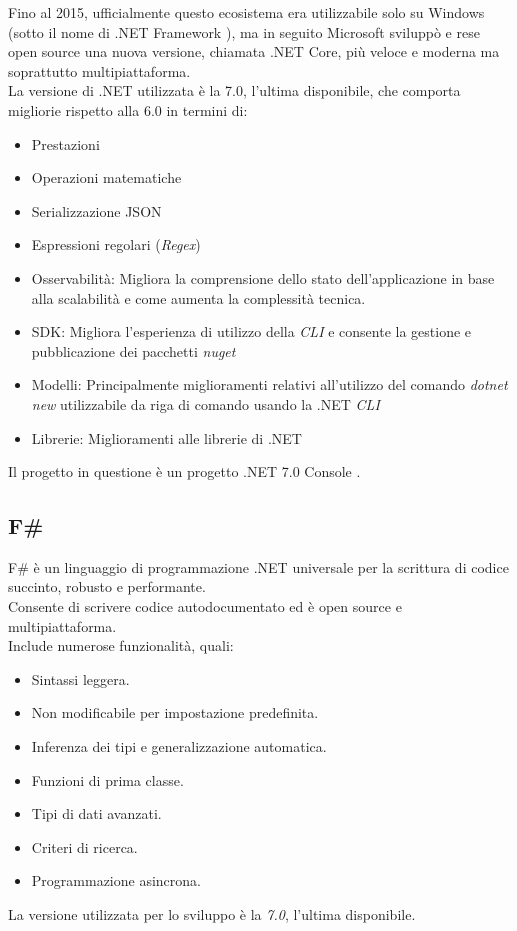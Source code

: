\documentclass[\main/tesi.tex]{subfiles}
\begin{document}
Fino al 2015, ufficialmente questo ecosistema era utilizzabile solo su Windows (sotto il nome di .NET Framework \cite{dotnet}), ma in seguito Microsoft sviluppò e rese open source una nuova versione, chiamata .NET Core, più veloce e moderna ma soprattutto multipiattaforma. \\
La versione di .NET \cite{dotnet} utilizzata è la 7.0, l'ultima disponibile, che comporta migliorie rispetto alla 6.0 in termini di:
\begin{itemize}
    \item Prestazioni
    \item Operazioni matematiche
    \item Serializzazione JSON
    \item Espressioni regolari (\textit{Regex})
    \item Osservabilità: Migliora la comprensione dello stato dell'applicazione in base alla scalabilità e come aumenta la complessità tecnica.
    \item SDK: Migliora l'esperienza di utilizzo della \textit{CLI} e consente la gestione e pubblicazione dei pacchetti \textit{nuget} \cite{nuget}
    \item Modelli: Principalmente miglioramenti relativi all'utilizzo del comando \textit{dotnet new} utilizzabile da riga di comando usando la .NET \textit{CLI} \cite{dotnet}
    \item Librerie: Miglioramenti alle librerie di .NET \cite{dotnet}
\end{itemize}
Il progetto in questione è un progetto .NET 7.0 Console \cite{dotnet}. \\

\subsection{F\#}
F\# \cite{fsharp} è un linguaggio di programmazione .NET \cite{dotnet} universale per la scrittura di codice succinto, robusto e performante. \\
Consente di scrivere codice autodocumentato ed è open source e multipiattaforma. \\
Include numerose funzionalità, quali:
\begin{itemize}
    \item Sintassi leggera.
    \item Non modificabile per impostazione predefinita.
    \item Inferenza dei tipi e generalizzazione automatica.
    \item Funzioni di prima classe.
    \item Tipi di dati avanzati.
    \item Criteri di ricerca.
    \item Programmazione asincrona.
\end{itemize}
La versione utilizzata per lo sviluppo è la \textit{7.0}, l'ultima disponibile.
\end{document}
